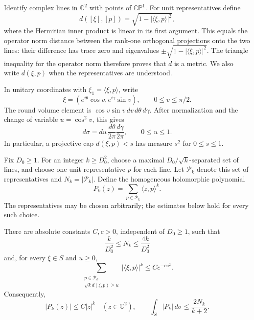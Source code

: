 Identify complex lines in $\mathbb C^2$ with points of
$\mathbb {CP}^1$.  For unit representatives define
\[
 d([\xi],[p])=\sqrt{1-|\langle\xi,p\rangle|^2},
\]
where the Hermitian inner product is linear in its first argument.
This equals the operator norm distance between the rank-one
orthogonal projections onto the two lines: their difference has
trace zero and eigenvalues
$\pm\sqrt{1-|\langle\xi,p\rangle|^2}$.  The triangle inequality
for the operator norm therefore proves that $d$ is a metric.  We also write
$d(\xi,p)$ when the representatives are understood.

In unitary coordinates with $\xi_1=\langle\xi,p\rangle$, write
\[
 \xi=(e^{i\theta}\cos v,e^{i\gamma}\sin v),
 \qquad 0\le v\le\pi/2.
\]
The round volume element is
$\cos v\sin v\,dv\,d\theta\,d\gamma$.  After normalization and
the change of variable $u=\cos^2v$, this gives
\begin{equation}\label{peaks:sphere-measure}
 d\sigma=du\,\frac{d\theta}{2\pi}\frac{d\gamma}{2\pi},
 \qquad 0\le u\le1.
\end{equation}
In particular, a projective cap $d(\xi,p)<s$ has measure $s^2$
for $0\le s\le1$.

Fix $D_0\ge1$.  For an integer $k\ge D_0^2$, choose a maximal
$D_0/\sqrt{k}$-separated set of lines, and choose one unit
representative $p$ for each line.  Let $\mathcal P_k$ denote this
set of representatives and $N_k=|\mathcal P_k|$.  Define the
homogeneous holomorphic polynomial
\begin{equation}\label{peaks:polynomial}
 P_k(z)=\sum_{p\in\mathcal P_k}\langle z,p\rangle^k.
\end{equation}
The representatives may be chosen arbitrarily; the estimates below
hold for every such choice.

\begin{lemma}\label{peaks:bounds}
There are absolute constants $C,c>0$, independent of $D_0\ge1$,
such that
\begin{equation}\label{peaks:count}
 \frac{k}{D_0^2}\le N_k\le\frac{4k}{D_0^2}
\end{equation}
and, for every $\xi\in S$ and $u\ge0$,
\begin{equation}\label{peaks:gaussian}
 \sum_{\substack{p\in\mathcal P_k\\\sqrt{k}d(\xi,p)\ge u}}
       |\langle\xi,p\rangle|^k\le Ce^{-cu^2}.
\end{equation}
Consequently,
\begin{equation}\label{peaks:global}
 |P_k(z)|\le C|z|^k\quad(z\in\mathbb C^2),
 \qquad
 \int_S|P_k|\,d\sigma\le\frac{2N_k}{k+2}.
\end{equation}
\end{lemma}

